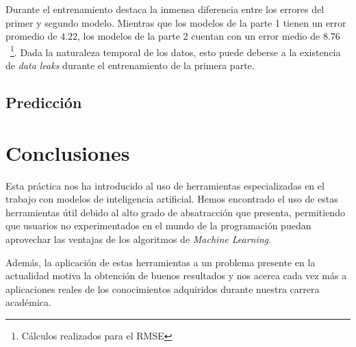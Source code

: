 \documentclass[12pt]{report} %
\begin{document}
Durante el entrenamiento destaca la inmensa diferencia entre los errores del primer y segundo modelo. Mientras que los modelos de la parte 1 tienen un error promedio de $4.22$, los modelos de la parte 2 cuentan con un error medio de $8.76$~\footnote{Cálculos realizados para el RMSE}. Dada la naturaleza temporal de los datos, esto puede deberse a la existencia de \textit{data leaks} durante el entrenamiento de la primera parte.

\section{Predicción}

\chapter{Conclusiones}
\label{chap:conclusion}

Esta práctica nos ha introducido al uso de herramientas especializadas en el trabajo con modelos de inteligencia artificial. Hemos encontrado el uso de estas herramientas útil debido al alto grado de absatracción que presenta, permitiendo que usuarios no experimentados en el mundo de la programación puedan aprovechar las ventajas de los algoritmos de \textit{Machine Learning}.

Además, la aplicación de estas herramientas a un problema presente en la actualidad motiva la obtención de buenos resultados y nos acerca cada vez más a aplicaciones reales de los conocimientos adquiridos durante nuestra carrera académica.



\clearpage

{}
\label{chap:bibliography}
\printbibliography




\end{document}
